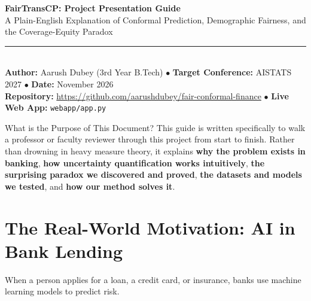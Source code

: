 \documentclass[11pt,a4paper]{article}
\begin{document}
\begin{center}
    {\Huge\bfseries\color{primarynavy} FairTransCP: Project Presentation Guide}\\[0.4cm]
    {\Large\color{accentblue} A Plain-English Explanation of Conformal Prediction, Demographic Fairness, and the Coverage-Equity Paradox}\\[0.5cm]
    \rule{0.85\textwidth}{1pt}\\[0.4cm]
    {\small \textbf{Author:} Aarush Dubey (3rd Year B.Tech) \quad $\bullet$ \quad \textbf{Target Conference:} AISTATS 2027 \quad $\bullet$ \quad \textbf{Date:} November 2026}\\[0.1cm]
    {\small \textbf{Repository:} \url{https://github.com/aarushdubey/fair-conformal-finance} \quad $\bullet$ \quad \textbf{Live Web App:} \texttt{webapp/app.py}}
\end{center}
\vspace{0.4cm}

\begin{conceptbox}{What is the Purpose of This Document?}
This guide is written specifically to walk a professor or faculty reviewer through this project from start to finish. Rather than drowning in heavy measure theory, it explains \textbf{why the problem exists in banking}, \textbf{how uncertainty quantification works intuitively}, \textbf{the surprising paradox we discovered and proved}, \textbf{the datasets and models we tested}, and \textbf{how our method solves it}.
\end{conceptbox}

\section{The Real-World Motivation: AI in Bank Lending}

When a person applies for a loan, a credit card, or insurance, banks use machine learning models to predict risk.
\end{document}
